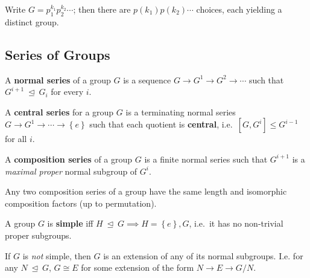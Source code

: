 Write \(G = p_1^{k_1} p_2^{k_2} \cdots\); then there are
\(p(k_1) p(k_2) \cdots\) choices, each yielding a distinct group.

\hypertarget{series-of-groups}{%
\subsection{Series of Groups}\label{series-of-groups}}

\begin{definition}

A \textbf{normal series} of a group \(G\) is a sequence
\(G \to G^1 \to G^2 \to \cdots\) such that
\(G^{i+1} {~\trianglelefteq~}G_i\) for every \(i\).

\end{definition}

\begin{definition}

A \textbf{central series} for a group \(G\) is a terminating normal
series \(G \to G^1 \to \cdots \to \left\{{e}\right\}\) such that each
quotient is \textbf{central}, i.e.~\([G, G^i] \leq G^{i-1}\) for all
\(i\).

\end{definition}

\begin{definition}

A \textbf{composition series} of a group \(G\) is a finite normal series
such that \(G^{i+1}\) is a \emph{maximal proper} normal subgroup of
\(G^i\).

\end{definition}

\begin{theorem}

Any two composition series of a group have the same length and
isomorphic composition factors (up to permutation).

\end{theorem}

\begin{definition}

A group \(G\) is \textbf{simple} iff
\(H{~\trianglelefteq~}G \implies H = \left\{{e}\right\}, G\), i.e.~it
has no non-trivial proper subgroups.

\end{definition}

\begin{proposition}

If \(G\) is \emph{not} simple, then \(G\) is an extension of any of its
normal subgroups. I.e. for any \(N{~\trianglelefteq~}G\), \(G \cong E\)
for some extension of the form \(N\to E\to G/N\).

\end{proposition}

